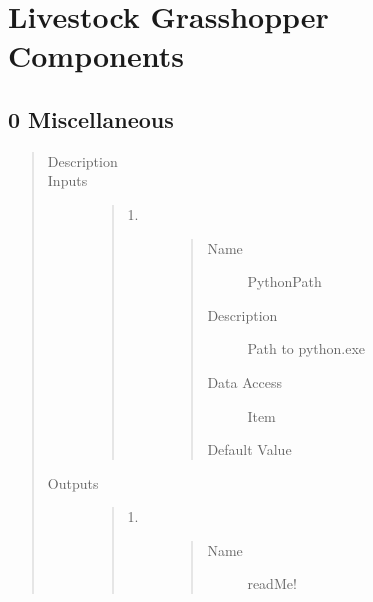 \documentclass[letterpaper,10pt,english]{sphinxmanual}
\begin{document}
\chapter{Livestock Grasshopper Components}
\label{\detokenize{components::doc}}\label{\detokenize{components:livestock-grasshopper-components}}\label{\detokenize{components:welcome-to-livestock-gh-s-documentation}}

\section{0 \textbar{} Miscellaneous}
\label{\detokenize{components:miscellaneous}}
\begin{quote}\begin{description}
\item[{Description}] \leavevmode
{}

\item[{Inputs}] \leavevmode\begin{quote}\begin{description}
\item[{1.}] \leavevmode\begin{quote}\begin{description}
\item[{Name}] \leavevmode
PythonPath

\item[{Description}] \leavevmode
Path to python.exe

\item[{Data Access}] \leavevmode
Item

\item[{Default Value}] \leavevmode
{}

\end{description}\end{quote}

\end{description}\end{quote}

\item[{Outputs}] \leavevmode\begin{quote}\begin{description}
\item[{1.}] \leavevmode\begin{quote}\begin{description}
\item[{Name}] \leavevmode
readMe!


\end{description}
\end{quote}
\end{description}
\end{quote}
\end{description}
\end{quote}
\end{document}
